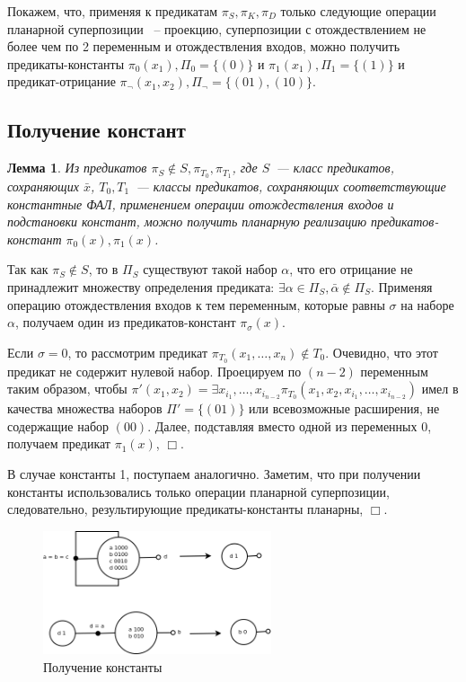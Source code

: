 \documentclass[12pt]{extarticle}
\newtheorem{lemma}[theorem]{Лемма}
\newenvironment{proof}[1][Доказательство.]{\begin{trivlist}
\item[\hskip \labelsep {\bfseries #1}]}{\end{trivlist}}
\begin{document}
Покажем, что, применяя к предикатам $\pi_S, \pi_K, \pi_D$ только следующие операции планарной суперпозиции ~-- проекцию,
суперпозиции с отождествлением не более чем по 2 переменным и отождествления входов, 
можно получить предикаты-константы
$\pi_0(x_1), \Pi_0=\{ (0) \}$ и $\pi_1(x_1), \Pi_1=\{ (1) \}$ и предикат-отрицание 
$\pi_{\neg}(x_1, x_2), \Pi_{\neg}=\{ (01), (10) \}$.

\subsection{Получение констант}
\begin{lemma}
\label{eq:const}
Из предикатов $\pi_S \notin S, \pi_{T_0}, \pi_{T_1}$, где $S$~--- класс предикатов, сохраняющих $\bar{x}$, 
$T_0, T_1$~--- классы предикатов, сохраняющих соответствующие константные ФАЛ, 
применением операции отождествления входов и подстановки констант,
можно получить планарную реализацию предикатов-констант $\pi_0(x), \pi_1(x)$.
\end{lemma}

\begin{proof}
Так как $\pi_S \notin S$, то в $\Pi_S$ существуют такой набор
$\alpha$, что его отрицание не принадлежит множеству определения предиката:
$\exists \alpha \in \Pi_S, \bar{\alpha} \notin \Pi_S$.
Применяя операцию отождествления входов к тем переменным, которые равны $\sigma$ на наборе $\alpha$,
получаем один из предикатов-констант $\pi_{\sigma}(x)$.

Если $\sigma = 0$, то рассмотрим предикат 
$\pi_{T_0}(x_1, \dots, x_n) \notin T_0$. Очевидно, что этот предикат не содержит нулевой набор. 
Проецируем по $(n-2)$ переменным таким образом, чтобы 
$\pi'(x_1, x_2) = \exists {x_{i_1}, \dots, x_{i_{n-2}}} \pi_{T_0}(x_1, x_2, x_{i_1}, \dots, x_{i_{n-2}})$
имел в качества множества наборов $\Pi' = \{ (01) \}$ или всевозможные расширения, не содержащие набор $(00)$.
Далее, подставляя вместо одной из переменных 0, получаем предикат $\pi_1(x)$, $\Box$. 

В случае константы 1, поступаем аналогично. 
Заметим, что при получении константы использовались только операции планарной суперпозиции, следовательно, 
результирующие предикаты-константы планарны, $\Box$.
\end{proof}
\begin{figure}[htb]
\centering
\includegraphics[width=0.6\textwidth]{const.png}
\caption{Получение константы}
\label{fig:constant}
\end{figure}
\end{document}
